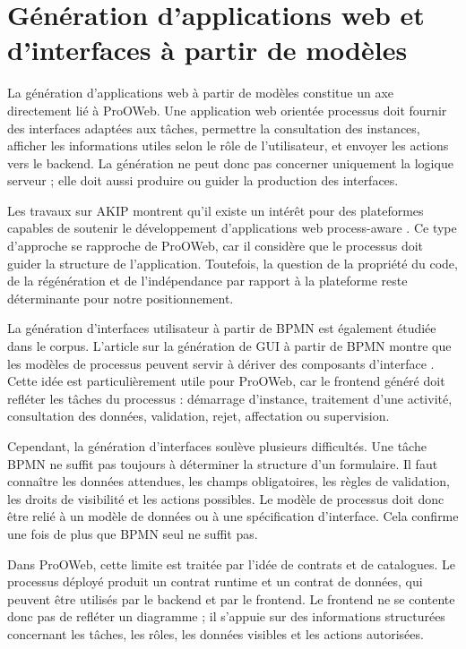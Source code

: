 \documentclass[12pt,a4paper]{article}
\begin{document}
\section{Génération d'applications web et d'interfaces à partir de modèles}

La génération d'applications web à partir de modèles constitue un axe directement lié à ProOWeb. Une application web orientée processus doit fournir des interfaces adaptées aux tâches, permettre la consultation des instances, afficher les informations utiles selon le rôle de l'utilisateur, et envoyer les actions vers le backend. La génération ne peut donc pas concerner uniquement la logique serveur ; elle doit aussi produire ou guider la production des interfaces.

Les travaux sur AKIP montrent qu'il existe un intérêt pour des plateformes capables de soutenir le développement d'applications web process-aware \cite{neto2022}. Ce type d'approche se rapproche de ProOWeb, car il considère que le processus doit guider la structure de l'application. Toutefois, la question de la propriété du code, de la régénération et de l'indépendance par rapport à la plateforme reste déterminante pour notre positionnement.

La génération d'interfaces utilisateur à partir de BPMN est également étudiée dans le corpus. L'article sur la génération de GUI à partir de BPMN montre que les modèles de processus peuvent servir à dériver des composants d'interface \cite{gui2023}. Cette idée est particulièrement utile pour ProOWeb, car le frontend généré doit refléter les tâches du processus : démarrage d'instance, traitement d'une activité, consultation des données, validation, rejet, affectation ou supervision.

Cependant, la génération d'interfaces soulève plusieurs difficultés. Une tâche BPMN ne suffit pas toujours à déterminer la structure d'un formulaire. Il faut connaître les données attendues, les champs obligatoires, les règles de validation, les droits de visibilité et les actions possibles. Le modèle de processus doit donc être relié à un modèle de données ou à une spécification d'interface. Cela confirme une fois de plus que BPMN seul ne suffit pas.

Dans ProOWeb, cette limite est traitée par l'idée de contrats et de catalogues. Le processus déployé produit un contrat runtime et un contrat de données, qui peuvent être utilisés par le backend et par le frontend. Le frontend ne se contente donc pas de refléter un diagramme ; il s'appuie sur des informations structurées concernant les tâches, les rôles, les données visibles et les actions autorisées.
\end{document}
